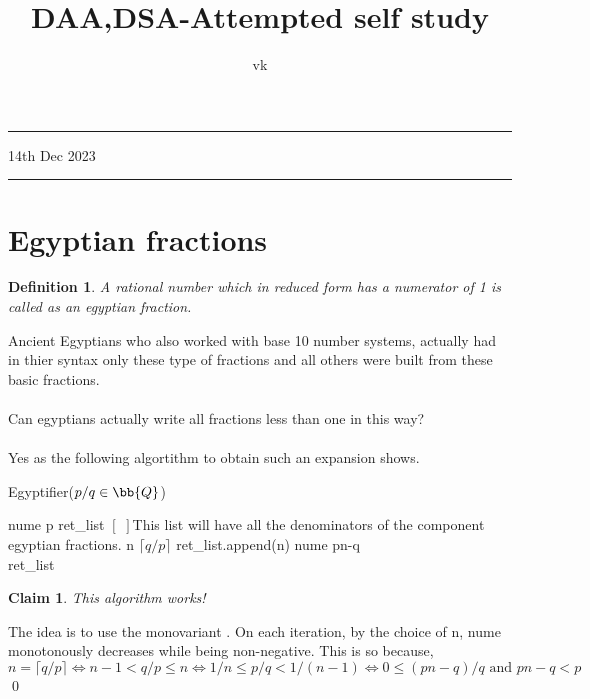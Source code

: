 \documentclass{myclass}
\title{DAA,DSA-Attempted self study}
\author{vk}
\date{}
\newtheorem*{definition}{Definition}
\newtheorem*{claim}{Claim}
\begin{document}
\maketitle

\hrule
\vspace{-0.15cm}
\begin{flushleft}
    14th Dec 2023
\end{flushleft}
\vspace{-0.15cm}
\hrule

\section*{Egyptian fractions}

\begin{definition}
    A rational number which in reduced form has a numerator of 1 is called as an egyptian fraction.
\end{definition}

 Ancient Egyptians who also worked with base 10 number systems, actually had in thier syntax only these type of fractions
and all others were built from these basic fractions.
\\\\
 Can egyptians actually write all fractions less than one in this way?
\\\\
 Yes as the following algortithm to obtain such an expansion shows.

\begin{algorithm}
    \caption*{Egyptifier($p/q\in \bb{Q}$)}
    \begin{algorithmic}[1] 
        \State nume \ass p
        \State ret\_list \ass $[\,\,]$\hspace{0.5cm}\Comment This list will have all the denominators of the component egyptian fractions.
            \State n \ass $\lceil q/p \rceil$
            \State ret\_list.append(n)
            \State nume \ass pn-q
        \EndWhile\\
         ret\_list
    \end{algorithmic}
\end{algorithm}

\begin{claim}
    This algorithm works!
\end{claim}
\begin{prf}
    The idea is to use the monovariant . On each iteration, by the choice of n, nume monotonously decreases 
    while being non-negative. This is so because,
    $$n=\lceil q/p \rceil \iff n-1<q/p\leq n \iff 1/n\leq p/q <1/(n-1) \iff 0 \leq (pn-q)/q \text{ and }pn-q<p$$
    \qed
\end{prf}
\end{document}
